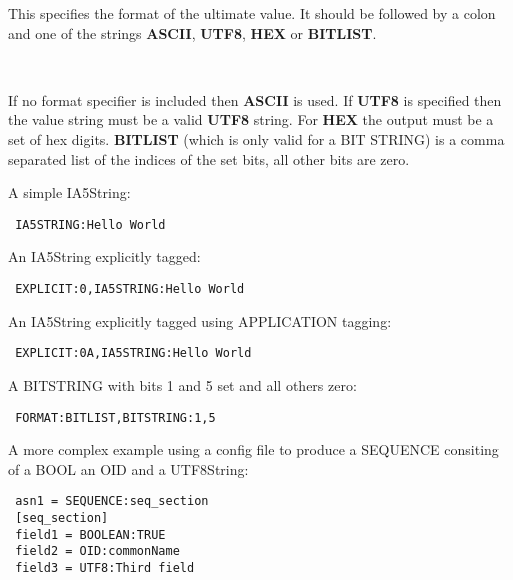 \documentclass[]{article}
\let\realtextbf=\textbf
\renewcommand{\textbf}[1]{\textcolor{boldcolor}{\realtextbf{#1}}}
\begin{document}
\begin{description}
\itemsep1pt\parskip0pt
\item[\textbf{FORMAT}]
This specifies the format of the ultimate value. It should be followed
by a colon and one of the strings \textbf{ASCII}, \textbf{UTF8},
\textbf{HEX} or \textbf{BITLIST}.

~

If no format specifier is included then \textbf{ASCII} is used. If
\textbf{UTF8} is specified then the value string must be a valid
\textbf{UTF8} string. For \textbf{HEX} the output must be a set of hex
digits. \textbf{BITLIST} (which is only valid for a BIT STRING) is a
comma separated list of the indices of the set bits, all other bits are
zero.
\end{description}


A simple IA5String:

\begin{verbatim}
 IA5STRING:Hello World
\end{verbatim}

An IA5String explicitly tagged:

\begin{verbatim}
 EXPLICIT:0,IA5STRING:Hello World
\end{verbatim}

An IA5String explicitly tagged using APPLICATION tagging:

\begin{verbatim}
 EXPLICIT:0A,IA5STRING:Hello World
\end{verbatim}

A BITSTRING with bits 1 and 5 set and all others zero:

\begin{verbatim}
 FORMAT:BITLIST,BITSTRING:1,5
\end{verbatim}

A more complex example using a config file to produce a SEQUENCE
consiting of a BOOL an OID and a UTF8String:

\begin{verbatim}
 asn1 = SEQUENCE:seq_section
 [seq_section]
 field1 = BOOLEAN:TRUE
 field2 = OID:commonName
 field3 = UTF8:Third field
\end{verbatim}
\end{document}

